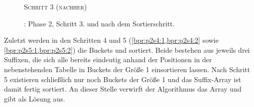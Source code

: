 \begin{figure}[H]
    {\centering\begin{minipage}{\textwidth}
        {\large \textsc{Schritt 3 (nachher)}}\par\medskip
    \end{minipage}}
    \caption[\bpr: Phase 2, Schritt 3 (nachher)]{\bpr: Phase 2, Schritt 3. \sa und \bptr nach dem Sortierschritt.}
    \label{bpr:p2s3:2}
\end{figure}
Zuletzt werden in den Schritten 4 und 5 (\cref{bpr:p2s4:1,bpr:p2s4:2} sowie \cref{bpr:p2s5:1,bpr:p2s5:2}) die Buckets  und  sortiert. Beide bestehen aus jeweils drei Suffixen, die sich alle bereits eindeutig anhand der Positionen in der nebenstehenden Tabelle in Buckets der Größe 1 einsortieren lassen. Nach Schritt 5 existieren schließlich nur noch Buckets der Größe 1 und das Suffix-Array ist damit fertig sortiert. An dieser Stelle verwirft der Algorithmus das Array \bptr und gibt \sa als Lösung aus.
